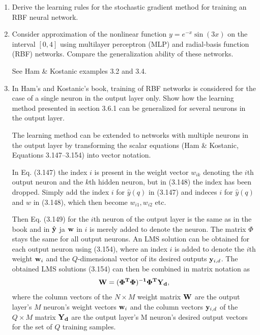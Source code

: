 \begin{enumerate}
\begin{solution}
  \end{solution}
  
\item Derive the learning rules for the stochastic gradient method for
  training an RBF neural network.

  \begin{solution}

  \end{solution}
  
  
\item Consider approximation of the nonlinear function $y = e^{-x} \sin(3x)$
  on the interval $[0,4]$ using multilayer perceptron (MLP) and radial-basis
  function (RBF) networks. Compare the generalization ability of these
  networks.

  \begin{solution}

    See Ham \& Kostanic examples 3.2 and 3.4.
  \end{solution}

  
\item In Ham's and Kostanic's book, training of RBF networks is considered for the
  case of a single neuron in the output layer only. Show how the learning method
  presented in section 3.6.1 can be generalized for several neurons in the
  output layer.

  \begin{solution}

    The learning method can be extended to networks with multiple neurons
    in the output layer by transforming the scalar equations (Ham \&
    Kostanic, Equations 3.147--3.154) into vector notation.

    In Eq. (3.147) the index $i$ is present in the weight vector $w_{ik}$
    denoting the $i$th output neuron and the $k$th hidden neuron, but in
    (3.148) the index has been dropped. Simply add the index $i$ for
    $\hat{y}(q)$ in (3.147) and indeces $i$ for $\hat{y}(q)$ and $w$ in
    (3.148), which then become $w_{i1}, w_{i2}$ etc.


    Then Eq. (3.149) for the $i$th neuron of the output layer is the same
    as in the book and in  $\hat{{\bf y}}$ ja ${\bf w}$ in $i$ is merely
    added to denote the neuron. The matrix $\Phi$ stays the same for all
    output neurons. An LMS solution can be obtained for each output
    neuron using (3.154), where an index $i$
    is added to denote the $i$th weight ${\bf w}_i$ and the
    $Q$-dimensional vector of its desired outputs ${\bf y}_{i,d}$.
    The obtained LMS solutions (3.154) can then be combined in matrix
    notation as
    \[
    \bf{W} = (\Phi^T \Phi)^{-1}\Phi^T \bf{Y}_d,\] 
    where the column vectors of the $N\times M$ weight matrix $\bf{W}$ are the output layer's $M$ neuron's
    weight vectors ${\bf w}_i$ and the column vectors ${\bf y}_{i,d}$ of the $Q \times M$ matrix $\bf{Y}_d$
    are the output layer's M neuron's desired output vectors for the
    set of $Q$ training samples.

  \end{solution}
  
\end{enumerate}

